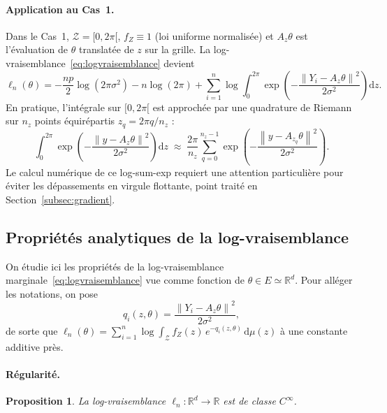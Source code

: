 \documentclass[12pt, a4paper]{article}
\newtheorem{proposition}[theorem]{Proposition}
\theoremstyle{definition}
\newcommand{\R}{\mathbb{R}}
\newcommand{\Zcal}{\mathcal{Z}}
\newcommand{\norm}[1]{\left\|#1\right\|}
\begin{document}
\paragraph{Application au Cas~1.}
Dans le Cas~1, $\Zcal = [0, 2\pi[$, $f_Z \equiv 1$ (loi uniforme normalisée) et
$A_z\theta$ est l'évaluation de $\theta$ translatée de $z$ sur la grille.
La log-vraisemblance~\eqref{eq:logvraisemblance} devient
\[
    \ell_n(\theta)
    = -\frac{np}{2}\log(2\pi\sigma^2) - n\log(2\pi)
      + \sum_{i=1}^{n} \log\!\int_0^{2\pi}
        \exp\!\left(-\frac{\norm{Y_i - A_z\theta}^2}{2\sigma^2}\right)\mathrm{d}z.
\]
En pratique, l'intégrale sur $[0, 2\pi[$ est approchée par une quadrature de
Riemann sur $n_z$ points équirépartis $z_q = 2\pi q/n_z$ :
\[
    \int_0^{2\pi}
    \exp\!\left(-\frac{\norm{y - A_z\theta}^2}{2\sigma^2}\right)\mathrm{d}z
    \;\approx\;
    \frac{2\pi}{n_z}\sum_{q=0}^{n_z-1}
    \exp\!\left(-\frac{\norm{y - A_{z_q}\theta}^2}{2\sigma^2}\right).
\]
Le calcul numérique de ce log-sum-exp requiert une attention particulière pour
éviter les dépassements en virgule flottante, point traité en
Section~\ref{subsec:gradient}.

\subsection{Propriétés analytiques de la log-vraisemblance}
\label{subsec:proprietes_ll}

On étudie ici les propriétés de la log-vraisemblance marginale~\eqref{eq:logvraisemblance}
vue comme fonction de $\theta \in E \simeq \R^d$. Pour alléger les notations, on pose
\[
    q_i(z, \theta) = \frac{\norm{Y_i - A_z\theta}^2}{2\sigma^2},
\]
de sorte que $\ell_n(\theta) = \sum_{i=1}^n \log \int_\Zcal f_Z(z)\, e^{-q_i(z,\theta)}\,\mathrm{d}\mu(z)$
à une constante additive près.

\paragraph{Régularité.}

\begin{proposition}
La log-vraisemblance $\ell_n : \R^d \to \R$ est de classe $C^\infty$.
\end{proposition}
\end{document}
